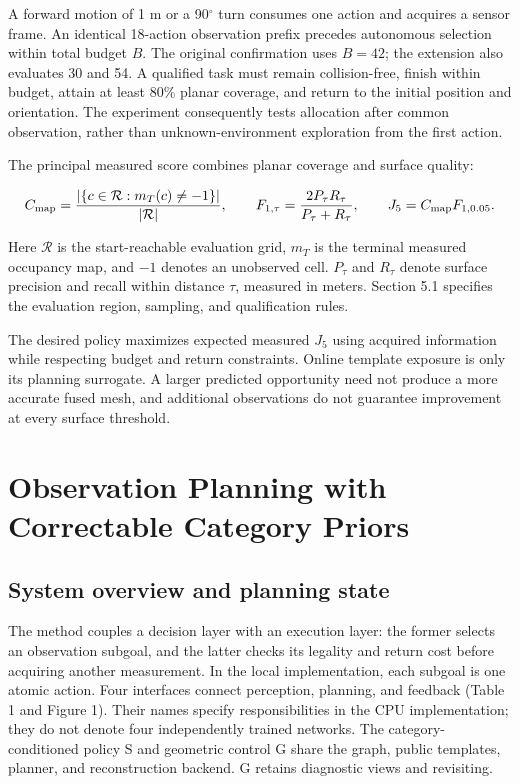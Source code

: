 \documentclass[pdflatex,sn-mathphys-num]{sn-jnl}
\begin{document}
A forward motion of 1 m or a 90\ensuremath{^{\circ}} turn consumes one action and acquires a sensor frame. An identical 18-action observation prefix precedes autonomous selection within total budget \(B\). The original confirmation uses \(B=42\); the extension also evaluates 30 and 54. A qualified task must remain collision-free, finish within budget, attain at least 80\% planar coverage, and return to the initial position and orientation. The experiment consequently tests allocation after common observation, rather than unknown-environment exploration from the first action.

The principal measured score combines planar coverage and surface quality:

\[
C_{\rm map}=\frac{|\{c\in\mathcal R:m_T(c)\ne-1\}|}{|\mathcal R|},
\qquad F_{1,\tau}=\frac{2P_\tau R_\tau}{P_\tau+R_\tau},
\qquad J_5=C_{\rm map}F_{1,0.05}.
\]

Here \(\mathcal R\) is the start-reachable evaluation grid, \(m_T\) is the terminal measured occupancy map, and \(-1\) denotes an unobserved cell. \(P_\tau\) and \(R_\tau\) denote surface precision and recall within distance \(\tau\), measured in meters. Section 5.1 specifies the evaluation region, sampling, and qualification rules.

The desired policy maximizes expected measured \(J_5\) using acquired information while respecting budget and return constraints. Online template exposure is only its planning surrogate. A larger predicted opportunity need not produce a more accurate fused mesh, and additional observations do not guarantee improvement at every surface threshold.

\hypertarget{observation-planning-with-correctable-category-priors}{%
\section{Observation Planning with Correctable Category Priors}\label{observation-planning-with-correctable-category-priors}}

\hypertarget{system-overview-and-planning-state}{%
\subsection{System overview and planning state}\label{system-overview-and-planning-state}}

The method couples a decision layer with an execution layer: the former selects an observation subgoal, and the latter checks its legality and return cost before acquiring another measurement. In the local implementation, each subgoal is one atomic action. Four interfaces connect perception, planning, and feedback (Table 1 and Figure 1). Their names specify responsibilities in the CPU implementation; they do not denote four independently trained networks. The category-conditioned policy S and geometric control G share the graph, public templates, planner, and reconstruction backend. G retains diagnostic views and revisiting.
\end{document}
